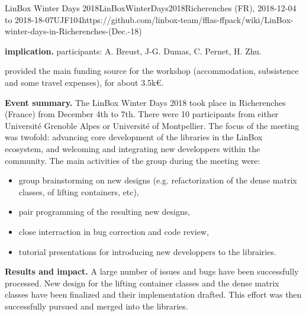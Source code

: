 \begin{event}{LinBox Winter Days 2018}{LinBoxWinterDays2018}{Richerenches (FR),
2018-12-04 to 2018-18-07}{UJF}{10}{4}{https://github.com/linbox-team/fflas-ffpack/wiki/LinBox-winter-days-in-Richerenches-(Dec.-18)}

\textbf{\ODK implication.} \ODK participants: A. Breust, J-G. Dumas, C. Pernet, H. Zhu.

\ODK provided the main funding source for the workshop (accommodation,
subsistence and some travel expenses), for about 3.5k\euro.

\textbf{Event summary.} The LinBox Winter Days 2018 took place in Richerenches
(France) from December 4th to 7th.
There were 10 participants from either Université Grenoble Alpes or Université of Montpellier. The focus of the meeting
was twofold: advancing core development of the libraries in the LinBox ecosystem, and welcoming and integrating new
developpers within the community. The main activities of the group during the meeting were:
\begin{itemize}
\item group brainstorming on new designs (e.g. refactorization of the dense matrix classes, of lifting containers, etc),
\item pair programming of the resulting new designs,
\item close interraction in bug correction and code review,
\item tutorial presentations for introducing new developpers to the librairies.
\end{itemize}

\textbf{Results and impact.} A large number of issues and bugs have been successfully processed. New design for the
lifting container classes and the dense matrix classes have been finalized and their implementation drafted. This effort
was then successfully pursued and merged into the libraries.

\end{event}
